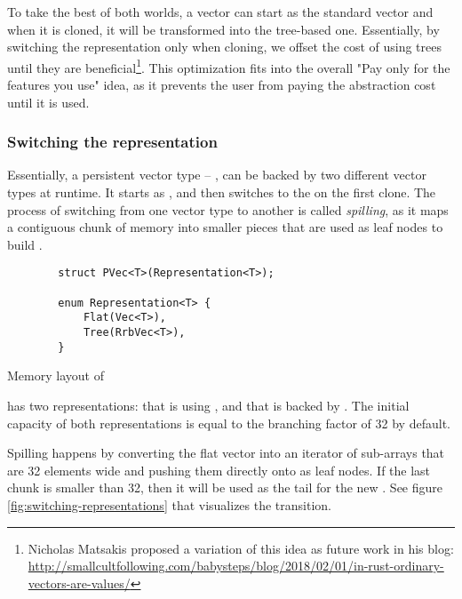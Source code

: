 To take the best of both worlds, a vector can start as the standard vector and when it is cloned, it will be transformed into the tree-based one. Essentially, by switching the representation only when cloning, we offset the cost of using trees until they are beneficial\footnote{Nicholas Matsakis proposed a variation of this idea as future work in his blog: \url{http://smallcultfollowing.com/babysteps/blog/2018/02/01/in-rust-ordinary-vectors-are-values/}}. This optimization fits into the overall "Pay only for the features you use" idea, as it prevents the user from paying the abstraction cost until it is used.

\subsubsection*{Switching the representation}
Essentially, a persistent vector type -- \pvec{}, can be backed by two different vector types at runtime. It starts as \stdvec{}, and then switches to the \rrbvec{} on the first clone. The process of switching from one vector type to another is called \emph{spilling}, as it maps a contiguous chunk of memory into smaller pieces that are used as leaf nodes to build \rrbvec{}.

\begin{listing}[H]

    \centering
    \begin{verbatim}
        struct PVec<T>(Representation<T>);

        enum Representation<T> {
            Flat(Vec<T>),
            Tree(RrbVec<T>),
        }
    \end{verbatim}

    \caption{Memory layout of \pvec{}}
    \label{lst:pvec-memory-representation}
\end{listing}

\pvec{} has two representations:  that is using \stdvec{}, and  that is backed by \rrbvec{}. The initial capacity of both representations is equal to the branching factor of 32 by default.

Spilling happens by converting the flat vector into an iterator of sub-arrays that are 32 elements wide and pushing them directly onto \rrbtree{} as leaf nodes. If the last chunk is smaller than 32, then it will be used as the tail for the new \rrbvec{}. See figure \ref{fig:switching-representations} that visualizes the transition.

